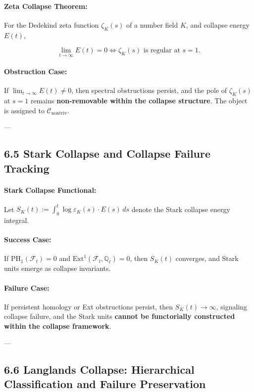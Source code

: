 \documentclass[11pt]{article}
\begin{document}
\paragraph{Zeta Collapse Theorem:}
For the Dedekind zeta function \( \zeta_K(s) \) of a number field \( K \), and collapse energy \( E(t) \),

\[
\lim_{t \to \infty} E(t) = 0 \iff \zeta_K(s) \text{ is regular at } s = 1.
\]

\paragraph{Obstruction Case:}
If \( \lim_{t \to \infty} E(t) \neq 0 \), then spectral obstructions persist, and the pole of \( \zeta_K(s) \) at \( s = 1 \) remains \textbf{non-removable within the collapse structure}. The object is assigned to \( \mathcal{C}_{\mathrm{nontriv}} \).

---

\subsection*{6.5 Stark Collapse and Collapse Failure Tracking}

\paragraph{Stark Collapse Functional:}
Let \( S_K(t) := \int_0^t \log \varepsilon_K(s) \cdot E(s) \, ds \) denote the Stark collapse energy integral.

\paragraph{Success Case:}
If \( \mathrm{PH}_1(\mathcal{F}_t) = 0 \) and \( \mathrm{Ext}^1(\mathcal{F}_t, \mathbb{Q}_\ell) = 0 \), then \( S_K(t) \) converges, and Stark units emerge as collapse invariants.

\paragraph{Failure Case:}
If persistent homology or Ext obstructions persist, then \( S_K(t) \to \infty \), signaling collapse failure, and the Stark units \textbf{cannot be functorially constructed within the collapse framework}.

---

\subsection*{6.6 Langlands Collapse: Hierarchical Classification and Failure Preservation}
\end{document}
